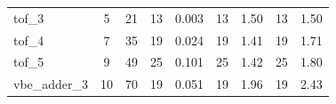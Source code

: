 \begin{table}[htbp]
\begin{tabular}{l c r | r r | r r | r r}
tof\_3 & 5 & 21 & \cellcolor{bestT}13 & 0.003 & \cellcolor{bestT}13 & \cellcolor{bestSpeed}1.50 & \cellcolor{bestT}13 & \cellcolor{bestSpeed}1.50 \\
tof\_4 & 7 & 35 & \cellcolor{bestT}19 & 0.024 & \cellcolor{bestT}19 & 1.41 & \cellcolor{bestT}19 & \cellcolor{bestSpeed}1.71 \\
tof\_5 & 9 & 49 & \cellcolor{bestT}25 & 0.101 & \cellcolor{bestT}25 & 1.42 & \cellcolor{bestT}25 & \cellcolor{bestSpeed}1.80 \\
vbe\_adder\_3 & 10 & 70 & \cellcolor{bestT}19 & 0.051 & \cellcolor{bestT}19 & 1.96 & \cellcolor{bestT}19 & \cellcolor{bestSpeed}2.43 \\
\bottomrule
\end{tabular}
\end{table}



